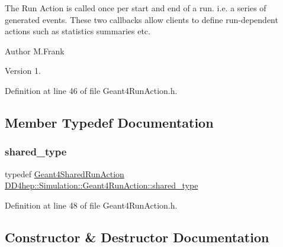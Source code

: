 The Run Action is called once per start and end of a run. i.\+e. a series of generated events. These two callbacks allow clients to define run-\/dependent actions such as statistics summaries etc.

\begin{DoxyAuthor}{Author}
M.\+Frank 
\end{DoxyAuthor}
\begin{DoxyVersion}{Version}
1. 
\end{DoxyVersion}


Definition at line 46 of file Geant4\+Run\+Action.\+h.



\subsection{Member Typedef Documentation}
\hypertarget{class_d_d4hep_1_1_simulation_1_1_geant4_run_action_a188fa9477fc65c6c825bf55abd0088e3}{}\label{class_d_d4hep_1_1_simulation_1_1_geant4_run_action_a188fa9477fc65c6c825bf55abd0088e3} 
\subsubsection{\texorpdfstring{shared\+\_\+type}{shared\_type}}
{\footnotesize\ttfamily typedef \hyperlink{class_d_d4hep_1_1_simulation_1_1_geant4_shared_run_action}{Geant4\+Shared\+Run\+Action} \hyperlink{class_d_d4hep_1_1_simulation_1_1_geant4_run_action_a188fa9477fc65c6c825bf55abd0088e3}{D\+D4hep\+::\+Simulation\+::\+Geant4\+Run\+Action\+::shared\+\_\+type}}



Definition at line 48 of file Geant4\+Run\+Action.\+h.



\subsection{Constructor \& Destructor Documentation}
\hypertarget{class_d_d4hep_1_1_simulation_1_1_geant4_run_action_a844999c8060118d8052d5fa3964f2e68}{}\label{class_d_d4hep_1_1_simulation_1_1_geant4_run_action_a844999c8060118d8052d5fa3964f2e68} 
